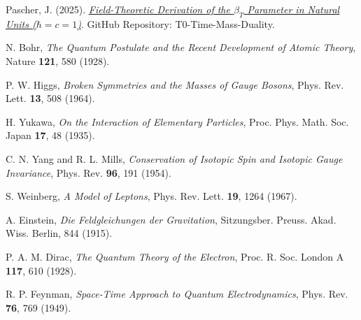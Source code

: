 \documentclass[12pt,a4paper]{article}
\theoremstyle{definition}
\theoremstyle{remark}
\begin{document}
	\begin{thebibliography}{99}
		
		Pascher, J. (2025). \href{https://github.com/jpascher/T0-Time-Mass-Duality/blob/main/2/pdf/DerivationVonBetaEn.pdf}{\textit{Field-Theoretic Derivation of the $\beta_T$ Parameter in Natural Units ($\hbar = c = 1$)}}. GitHub Repository: T0-Time-Mass-Duality.
		
		N. Bohr,
		\textit{The Quantum Postulate and the Recent Development of Atomic Theory},
		Nature \textbf{121}, 580 (1928).
		
		P. W. Higgs,
		\textit{Broken Symmetries and the Masses of Gauge Bosons},
		Phys. Rev. Lett. \textbf{13}, 508 (1964).
		
		H. Yukawa,
		\textit{On the Interaction of Elementary Particles},
		Proc. Phys. Math. Soc. Japan \textbf{17}, 48 (1935).
		
		C. N. Yang and R. L. Mills,
		\textit{Conservation of Isotopic Spin and Isotopic Gauge Invariance},
		Phys. Rev. \textbf{96}, 191 (1954).
		
		S. Weinberg,
		\textit{A Model of Leptons},
		Phys. Rev. Lett. \textbf{19}, 1264 (1967).
		
		A. Einstein,
		\textit{Die Feldgleichungen der Gravitation},
		Sitzungsber. Preuss. Akad. Wiss. Berlin, 844 (1915).
		
		P. A. M. Dirac,
		\textit{The Quantum Theory of the Electron},
		Proc. R. Soc. London A \textbf{117}, 610 (1928).
		
		R. P. Feynman,
		\textit{Space-Time Approach to Quantum Electrodynamics},
		Phys. Rev. \textbf{76}, 769 (1949).
		
	\end{thebibliography}
	
\end{document}
